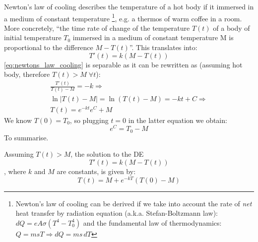 \documentclass[a4paper]{article}
\begin{document}
Newton's law of cooling describes the temperature of a hot body if it immersed in a medium of constant temperature \footnote{Newton's law of cooling can be derived if we take into account the rate of \textit{net} heat transfer by radiation equation (a.k.a. Stefan-Boltzmann law): $dQ =  eA\sigma(T^4 - T_0^4)$ and the fundamental law of thermodynamics: $Q = msT \Rightarrow dQ = ms \, dT$}, e.g. a thermos of warm coffee in a room. More concretely, ``the time rate of change of the temperature $T(t)$ of a body of initial temperature $T_0$ immersed in a medium of constant temperature M is proportional to the difference $M - T (t)$''. This translates into:
\begin{equation*}
    T'(t) = k\left(M - T(t) \right)
\end{equation*}
\eqref{eq:newtons_law_cooling} is separable as it can be rewritten as (assuming hot body, therefore $T(t)> M\; \forall t$):
\begin{gather*}
    \frac{T'(t)}{T(t) - M} = -k  \Rightarrow \\
    \ln\left|T(t) - M \right| = \ln\left( T(t) - M \right) = -kt + C \Rightarrow \\
    T(t) = e^{-kt}e^C + M
\end{gather*}
We know $T(0) = T_0$, so plugging $t=0$ in the latter equation we obtain:
\[
   e^C = T_0 - M 
\]
To summarise.
\begin{corollary}
Assuming $T(t) > M$, the solution to the DE 
\begin{equation}
    T'(t) = k\left(M - T(t) \right)
    \label{eq:newtons_law_cooling}
\end{equation}
, where $k$ and $M$ are constants, is given by:
\begin{equation}
    T(t) = M + e^{-kT}(T(0) - M)
    \label{eq:newtons_law_cooling_sol}
\end{equation}
\end{corollary}
\end{document}
